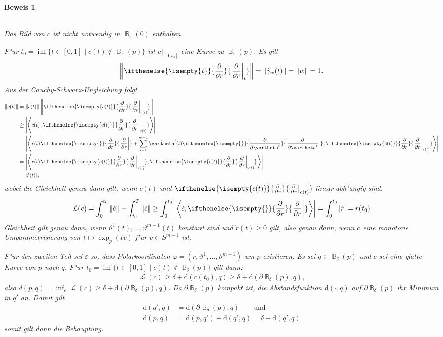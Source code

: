\documentclass[paper=A4, twoside, chapterprefix=true, bibliography=totoc, headsepline]{scrbook}
\let\temp\phi{}
\let\phi\varphi{}
\let\varphi\temp{}
\let\temp\theta{}
\let\theta\vartheta{}
\let\vartheta\temp{}
\let\temp\epsilon{}
\let\epsilon\varepsilon{}
\let\varepsilon\temp{}
\let\temp\rho{}
\let\rho\varrho{}
\let\varrho\temp{}
\DeclareMathOperator{\B}{\mathbb{B}} %
\DeclareMathOperator{\calL}{\mathcal{L}}
\newcommand{\dop}{\mathrm{d}}
\newcommand{\pdifffrac}[3][]{\ifthenelse{\isempty{#1}}{\frac{\partial #2}{\partial #3}}{\left. \frac{\partial #2}{\partial #3} \right|_{#1}}}
\theoremstyle{plain}
\theoremstyle{nonumberplain}
\newtheorem{bew}{Beweis}
\theoremstyle{empty}
\theoremstyle{break}
\begin{document}
\begin{bew}
\begin{center}
\\
    Das Bild von $c$ ist nicht notwendig in $\B_\epsilon(0)$ enthalten
  \end{center}
  F"ur $t_0 = \inf\{t \in [0,1] \mid c(t) \notin \B_{\epsilon}(p)\}$ ist $c|_{[0,t_0]}$ eine Kurve zu $\B_{\epsilon}(p)$.
  Es gilt
  \begin{align*}
    \left\|\pdifffrac[t]{}{r}\right\| = \|\dot\gamma_w(t)\| = \|w\| = 1.
  \end{align*}
  Aus der Cauchy-Schwarz-Ungleichung folgt
  \begin{align*}
    \|\dot c(t)\| & = \|\dot c(t)\|\left\|\pdifffrac[c(t)]{}{r}\right\|\\
    & \geq \left|\left< \dot c(t), \pdifffrac[c(t)]{}{r}\right>\right|\\
    & = \left|\left<\dot r(t) \pdifffrac{}{r} + \sum_{i=1}^{m-1}\dot\theta^i(t)\pdifffrac{}{\theta^i},\pdifffrac[c(t)]{}{r}\right>\right|\\
    & = \left|\left<\dot r(t)\pdifffrac[c(t)]{}{r}, \pdifffrac[c(t)]{}{r}\right>\right|\\
    & = \left|\dot r(t)\right|,
  \end{align*}
  wobei die Gleichheit genau dann gilt, wenn $\dot c(t)$ und $\pdifffrac[c(t)]{}{r}$ linear abh"angig sind.
  \begin{align*}
    \mathcal L(c) = \int_0^{t_0}\|\dot c\| + \int_{t_0}^T\|\dot c\| \geq \int_0^{t_0} \left|\left<\dot c,\pdifffrac{}{r}\right>\right| = \int_0^{t_0}|\dot r| = r(t_0)
  \end{align*}
  Gleichheit gilt genau dann, wenn $\theta^1(t), \ldots, \theta^{m-1}(t)$ konstant sind und $\dot r(t) \geq 0$ gilt, also genau dann, wenn $c$ eine monotone Umparametrisierung von $t \mapsto \exp_p(tv)$ f"ur $v \in S^{m-1}$ ist.

  F"ur den zweiten Teil sei $\epsilon$ so, dass Polarkoordinaten $\phi=(r, \theta^1,\ldots ,\theta^{m-1})$ um $p$ existieren.
  Es sei $q \in \B_\delta(p)$ und $c$ sei eine glatte Kurve von $p$ nach $q$.
  F"ur $t_0 = \inf \{ t \in [0,1] \mid c(t) \notin \B_\delta(p) \}$ gilt dann:
  \begin{align*}
    \calL(c) \ge \delta + \dop(c(t_0), q) \ge \delta + \dop(\partial \B_\delta(p), q),
  \end{align*}
  also $d(p,q) = \inf_c \calL(c) \ge \delta + \dop(\partial \B_\delta(p), q)$. Da $\partial \B_\delta(p)$ kompakt ist, die Abstandsfunktion $\dop(\cdot, q)$ auf $\partial \B_\delta(p)$ ihr Minimum in $q'$ an. Damit gilt
  \begin{align*}
    \dop(q',q) &= \dop(\partial \B_\delta(p), q) \qquad \text{und}\\
    \dop(p,q) &= \dop(p,q') + \dop(q',q) = \delta + \dop(q',q)
  \end{align*}
  somit gilt dann die Behauptung.
\end{bew}
\end{document}
